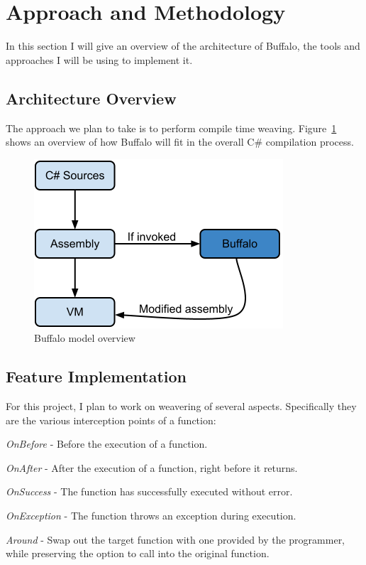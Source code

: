 \section{Approach and Methodology}
In this section I will give an overview of the architecture of Buffalo, the tools and approaches I will be using to implement it.

\subsection{Architecture Overview}
The approach we plan to take is to perform compile time weaving. Figure~\ref{buffalo_model} shows an overview of how Buffalo will fit in the overall C\# compilation process.

\begin{figure}[here]
  \includegraphics[scale=0.70]{model_overview.png}
  \centering
  \caption{Buffalo model overview\label{buffalo_model}}
\end{figure}

\subsection{Feature Implementation}
For this project, I plan to work on weavering of several aspects. Specifically they are the various interception points of a function: 

{\em OnBefore} - Before the execution of a function.

{\em OnAfter} - After the execution of a function, right before it returns.

{\em OnSuccess} - The function has successfully executed without error.

{\em OnException} - The function throws an exception during execution.

{\em Around} - Swap out the target function with one provided by the programmer, while preserving the option to call into the original function.

